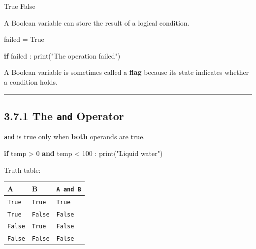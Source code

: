 \documentclass[
  11pt,
  a4paper,
]{article}
\newenvironment{Shaded}{}{}
\newcommand{\BuiltInTok}[1]{\textcolor[rgb]{0.00,0.50,0.00}{#1}}
\newcommand{\ControlFlowTok}[1]{\textcolor[rgb]{0.00,0.44,0.13}{\textbf{#1}}}
\newcommand{\DecValTok}[1]{\textcolor[rgb]{0.25,0.63,0.44}{#1}}
\newcommand{\KeywordTok}[1]{\textcolor[rgb]{0.00,0.44,0.13}{\textbf{#1}}}
\newcommand{\NormalTok}[1]{#1}
\newcommand{\OperatorTok}[1]{\textcolor[rgb]{0.40,0.40,0.40}{#1}}
\newcommand{\StringTok}[1]{\textcolor[rgb]{0.25,0.44,0.63}{#1}}
\newcommand{\VariableTok}[1]{\textcolor[rgb]{0.10,0.09,0.49}{#1}}
\begin{document}
\begin{Shaded}
\begin{Highlighting}[]
\VariableTok{True}
\VariableTok{False}
\end{Highlighting}
\end{Shaded}

A Boolean variable can store the result of a logical condition.

\begin{Shaded}
\begin{Highlighting}[]
\NormalTok{failed }\OperatorTok{=} \VariableTok{True}

\ControlFlowTok{if}\NormalTok{ failed :}
    \BuiltInTok{print}\NormalTok{(}\StringTok{"The operation failed"}\NormalTok{)}
\end{Highlighting}
\end{Shaded}

A Boolean variable is sometimes called a \textbf{flag} because its state
indicates whether a condition holds.

\begin{center}\rule{0.5\linewidth}{0.5pt}\end{center}

\subsection{\texorpdfstring{3.7.1 The \texttt{and}
Operator}{3.7.1 The and Operator}}\label{the-and-operator}

\texttt{and} is true only when \textbf{both} operands are true.

\begin{Shaded}
\begin{Highlighting}[]
\ControlFlowTok{if}\NormalTok{ temp }\OperatorTok{\textgreater{}} \DecValTok{0} \KeywordTok{and}\NormalTok{ temp }\OperatorTok{\textless{}} \DecValTok{100}\NormalTok{ :}
    \BuiltInTok{print}\NormalTok{(}\StringTok{"Liquid water"}\NormalTok{)}
\end{Highlighting}
\end{Shaded}

Truth table:

\begin{longtable}[]{@{}lll@{}}
\toprule\noalign{}
A & B & \texttt{A\ and\ B} \\
\midrule\noalign{}
\endhead
\bottomrule\noalign{}
\endlastfoot
\texttt{True} & \texttt{True} & \texttt{True} \\
\texttt{True} & \texttt{False} & \texttt{False} \\
\texttt{False} & \texttt{True} & \texttt{False} \\
\texttt{False} & \texttt{False} & \texttt{False} \\
\end{longtable}
\end{document}
